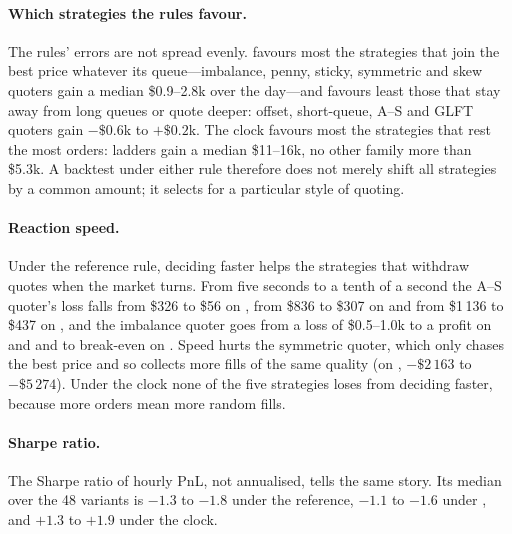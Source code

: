 \paragraph{Which strategies the rules favour.}
The rules' errors are not spread evenly. \touch{} favours most the strategies that
join the best price whatever its queue---imbalance, penny, sticky, symmetric and
skew quoters gain a median \$0.9--2.8k over the day---and favours least those
that stay away from long queues or quote deeper: offset, short-queue, A--S and
GLFT quoters gain $-\$0.6$k to $+\$0.2$k. The clock favours most the strategies
that rest the most orders: ladders gain a median \$11--16k, no other family more
than \$5.3k. A backtest under either rule therefore does not merely shift all
strategies by a common amount; it selects for a particular style of quoting.

\paragraph{Reaction speed.}
Under the reference rule, deciding faster helps the strategies that withdraw
quotes when the market turns. From five seconds to a tenth of a second the A--S
quoter's loss falls from \$326 to \$56 on \BTC, from \$836 to \$307 on \ETH{} and
from \$1\,136 to \$437 on \SOL, and the imbalance quoter goes from a loss of
\$0.5--1.0k to a profit on \BTC{} and \SOL{} and to break-even on \ETH. Speed hurts
the symmetric quoter, which only chases the best price and so collects more fills
of the same quality (on \BTC, $-\$2\,163$ to $-\$5\,274$). Under the clock none of
the five strategies loses from deciding faster, because more orders mean more
random fills.

\paragraph{Sharpe ratio.}
The Sharpe ratio of hourly PnL, not annualised, tells the same story. Its median
over the 48 variants is $-1.3$ to $-1.8$ under the reference, $-1.1$ to $-1.6$
under \touch, and $+1.3$ to $+1.9$ under the clock.
